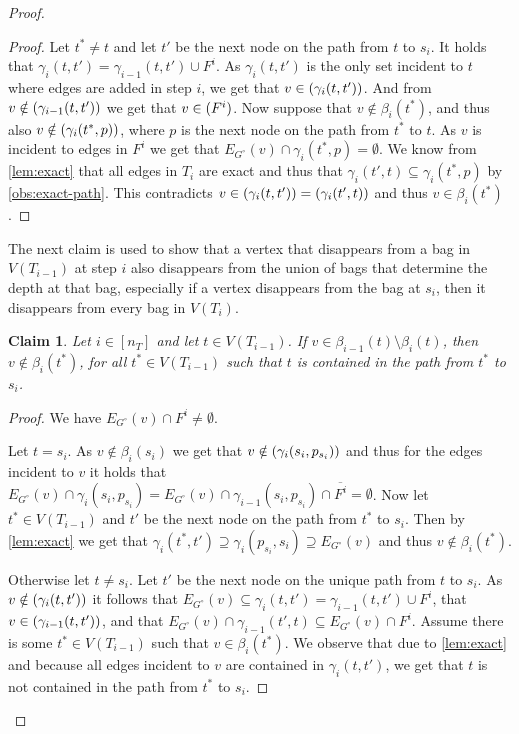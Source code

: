 \documentclass{lmcs}
\theoremstyle{plain}\newtheorem{claim}[thm]{Claim}   %
\newenvironment{claimproof}{\begin{proof}}{\renewcommand{\qedsymbol}{\ensuremath{\blacksquare}}\end{proof}}
\newcommand{\complementOf}[1]{\ensuremath{\overline{#1}}}
\newcommand{\complementOfB}[1]{\complementOf{#1}}
\let\boundary\relax
\newcommand{\boundary}{\Delta}
\begin{document}
\begin{proof}
	\begin{claimproof}
		Let $t^*\neq t$ and let $t'$ be the next node on the path from $t$ to $s_i$.
		It holds that $\gamma_i(t,t')=\gamma_{i-1}(t,t')\cup F^i$.
		As $\gamma_i(t,t')$ is the only set incident to $t$ where edges are added in step $i$, we get that $v\in\boundary(\gamma_i(t,t'))$.
		And from $v\notin\boundary(\gamma_{i-1}(t,t'))$ we get that $v\in\boundary(F^i)$.
		Now suppose that $v\notin \beta_i(t^*)$, and thus also $v\notin \boundary(\gamma_i(t^*,p))$, where $p$ is the next node on the path from $t^*$ to $t$.
		As $v$ is incident to edges in $F^i$ we get that $E_{G^\circ}(v) \cap \gamma_i(t^*,p) = \emptyset$.
		We know from \autoref{lem:exact} that all edges in $T_i$ are exact and thus that $\gamma_i(t',t)\subseteq \gamma_i(t^*,p)$ by \autoref{obs:exact-path}.
		This contradicts $v\in\boundary(\gamma_i(t,t'))=\boundary(\gamma_i(t',t))$ and thus $v\in\beta_i(t^*)$.
	\end{claimproof}
	
	The next claim is used to show that a vertex that disappears from a bag in $V(T_{i-1})$ at step $i$ also disappears from the union of bags that determine the depth at that bag, especially if a vertex disappears from the bag at $s_i$, then it disappears from every bag in $V(T_i)$.  
	
	\begin{claim}
		\label{cl:remove-vertex-new}
		Let $i\in [n_T]$ and let $t\in V(T_{i-1})$. If $v\in \beta_{i-1}(t)\setminus\beta_{i}(t)$, then $v\notin\beta_i(t^*)$, for all $t^*\in V(T_{i-1})$ 
		such that $t$ is contained in the path from $t^*$ to $s_i$.
	\end{claim}
	
	\begin{claimproof}
		We have $E_{G^\circ}(v)\cap F^i\neq \emptyset$.
		
		Let $t=s_i$.
		As $v\notin \beta_i(s_i)$ we get that $v\notin \boundary(\gamma_i(s_i,p_{s_i}))$ and thus for the edges incident to $v$ it holds that
		$E_{G^\circ}(v)\cap \gamma_i(s_i,p_{s_i}) = E_{G^\circ}(v)\cap \gamma_{i-1}(s_i,p_{s_i}) \cap \complementOfB{F^i} = \emptyset$.
		Now let $t^*\in V(T_{i-1})$ and $t'$ be the next node on the path from $t^*$ to $s_i$.
		Then by \autoref{lem:exact} we get that $\gamma_i(t^*,t')\supseteq\gamma_i(p_{s_i},s_i)\supseteq E_{G^\circ}(v)$ 
		and thus $v\notin\beta_i(t^*)$.
		
		Otherwise let $t\neq s_i$.
		Let $t'$ be the next node on the unique path from $t$ to $s_i$.
		As $v\notin\boundary(\gamma_i(t,t'))$ it follows that $E_{G^\circ}(v)\subseteq \gamma_i(t,t')=\gamma_{i-1}(t,t')\cup F^i$, that $v\in\boundary(\gamma_{i-1}(t,t'))$, and that $E_{G^\circ}(v) \cap \gamma_{i-1}(t',t)\subseteq E_{G^\circ}(v)\cap F^i$.
		Assume there is some $t^*\in V(T_{i-1})$ such that $v\in\beta_i(t^*)$.
		We observe that due to \autoref{lem:exact} and because all edges incident to $v$ are contained in $\gamma_i(t,t')$, we get that $t$ is not contained in the path from $t^*$ to $s_i$.
	\end{claimproof}
	

\end{proof}
\end{document}
